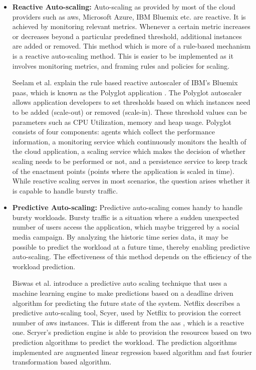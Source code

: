 \documentclass[article,type=msc,colorback,12pt,accentcolor=tud8b,table]{tudthesis}
\begin{document}
	\begin{itemize}
	
	\item{\textbf{Reactive Auto-scaling: }}Auto-scaling as provided by most of the cloud providers such as \gls{aws}, Microsoft Azure, IBM Bluemix etc. are reactive. It is achieved by monitoring relevant metrics. Whenever a certain metric increases or decreases beyond a particular predefined threshold, additional instances are added or removed. This method which is more of a rule-based mechanism is a reactive auto-scaling method. This is easier to be implemented as it involves monitoring metrics, and framing rules and policies for scaling. 
	
	Seelam et al. explain the rule based reactive autoscaler of IBM's Bluemix \gls{paas}, which is known as the Polyglot application \cite{seelam2015polyglot}. The Polyglot autoscaler allows application developers to set thresholds based on which instances need to be added (scale-out) or removed (scale-in). These threshold values can be parameters such as CPU Utilization, memory and heap usage. Polyglot consists of four components: agents which collect the performance information, a monitoring service which continuously monitors the health of the cloud application, a scaling service which makes the decision of whether scaling needs to be performed or not, and a persistence service to keep track of the enactment points (points where the application is scaled in time). While reactive scaling serves in most scenarios, the question arises whether it is capable to handle bursty traffic.

\item{\textbf{Predictive Auto-scaling: }}Predictive auto-scaling comes handy to handle bursty workloads. Bursty traffic is a situation where a sudden unexpected number of users access the application, which maybe triggered by a social media campaign. By analyzing the historic time series data, it may be possible to predict the workload at a future time, thereby enabling predictive auto-scaling. The effectiveness of this method depends on the efficiency of the workload prediction.

Biswas et al. \cite{biswas2015predictive} introduce a predictive auto scaling technique that uses a machine learning engine to make predictions based on a deadline driven algorithm for predicting the future state of the system. Netflix\cite{Scryer1, Scryer2} describes a predictive auto-scaling tool, Scyer, used by Netflix to provision the correct number of \gls{aws} \cite{aws} instances. This is different from the \gls{aas} \cite{aas}, which is a reactive one. Scryer's prediction engine is able to provision the resources based on two prediction algorithms to predict the workload. The prediction algorithms implemented are augmented linear regression based algorithm and fast fourier transformation based algorithm.


\end{itemize}
\end{document}
